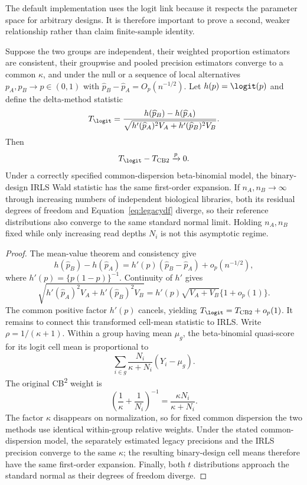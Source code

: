 The default implementation uses the logit link because it respects the
parameter space for arbitrary designs.  It is therefore important to prove a
second, weaker relationship rather than claim finite-sample identity.

\begin{proposition}
\label{prop:local}
Suppose the two groups are independent, their weighted proportion estimators
are consistent, their groupwise and pooled precision estimators converge to a
common $\kappa$, and under the null or a sequence of local alternatives
$p_A,p_B\rightarrow p\in(0,1)$ with
$\widehat p_B-\widehat p_A=O_p(n^{-1/2})$.  Let
$h(p)=\logit(p)$ and define the delta-method statistic
\[
 T_{\logit}=
 \frac{h(\widehat p_B)-h(\widehat p_A)}
 {\sqrt{h'(\widehat p_A)^2V_A+h'(\widehat p_B)^2V_B}}.
\]
Then
\[
 T_{\logit}-T_{\mathrm{CB2}}\xrightarrow{p}0.
\]
Under a correctly specified common-dispersion beta-binomial model, the
binary-design IRLS Wald statistic has the same first-order expansion.  If
$n_A,n_B\rightarrow\infty$ through increasing numbers of independent
biological libraries, both its residual degrees of freedom and
Equation~\eqref{eq:legacydf} diverge, so their reference distributions also
converge to the same standard normal limit.  Holding $n_A,n_B$ fixed while
only increasing read depths $N_i$ is not this asymptotic regime.
\end{proposition}

\begin{proof}
The mean-value theorem and consistency give
\[
 h(\widehat p_B)-h(\widehat p_A)
 =h'(p)(\widehat p_B-\widehat p_A)+o_p(n^{-1/2}),
\]
where $h'(p)=\{p(1-p)\}^{-1}$.  Continuity of $h'$ gives
\[
 \sqrt{h'(\widehat p_A)^2V_A+h'(\widehat p_B)^2V_B}
 =h'(p)\sqrt{V_A+V_B}\{1+o_p(1)\}.
\]
The common positive factor $h'(p)$ cancels, yielding
$T_{\logit}=T_{\mathrm{CB2}}+o_p(1)$.  It remains to connect this transformed
cell-mean statistic to IRLS.  Write $\rho=1/(\kappa+1)$.  Within a group having
mean $\mu_g$, the beta-binomial quasi-score for its logit cell mean is
proportional to
\[
 \sum_{i\in g}\frac{N_i}{\kappa+N_i}(Y_i-\mu_g).
\]
The original CB\textsuperscript{2} weight is
\[
 \left(\frac{1}{\kappa}+\frac{1}{N_i}\right)^{-1}
 =\frac{\kappa N_i}{\kappa+N_i}.
\]
The factor $\kappa$ disappears on normalization, so for fixed common
dispersion the two methods use identical within-group relative weights.
Under the stated common-dispersion model, the separately estimated legacy
precisions and the IRLS precision converge to the same $\kappa$; the resulting
binary-design cell means therefore have the same first-order expansion.
Finally, both $t$ distributions approach the standard normal as their degrees
of freedom diverge.
\end{proof}

